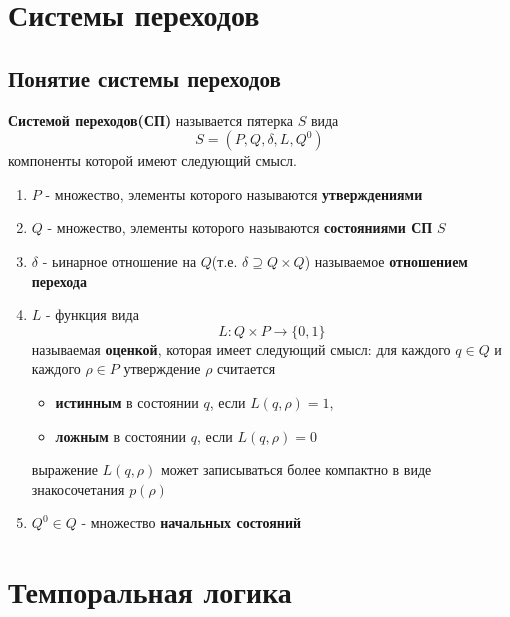 \documentclass[12pt, twoside]{report}
\begin{document}
\newpage
\section*{Системы переходов\cite{Mironov:ModelChecking}}
\label{system_SEQUENCE}

\subsection*{Понятие системы переходов}
\label{system_sequence_BASE}
\textbf{Системой переходов(СП)} называется пятерка $S$ вида
\begin{equation}\label{formula:1}
S = (P, Q, \delta, L, Q^0)
\end{equation}
компоненты которой имеют следующий смысл.
\begin{enumerate}
  \item $P$ - множество, элементы которого называются \textbf{утверждениями}
  \item $Q$ - множество, элементы которого называются \textbf{состояниями СП} $S$
  \item $\delta$ - ьинарное отношение на $Q$(т.е. $\delta \supseteq Q \times Q$) называемое 
        \textbf{отношением перехода}
  \item $L$ - функция вида
        \begin{equation}
		  L : Q \times P \to \{0, 1\}
		\end{equation}
		называемая \textbf{оценкой}, которая имеет следующий смысл: для каждого $q \in Q$ и 
		каждого $\rho \in P$ утверждение $\rho$ считается
		\begin{itemize}
		  \item \textbf{истинным} в состоянии $q$, если $L(q,\rho) = 1$, 
		  \item \textbf{ложным} в состоянии $q$, если $L(q,\rho) = 0$
		\end{itemize}
		выражение $L(q,\rho)$ может записываться более компактно в виде знакосочетания $p(\rho)$
  \item $Q^0 \in Q$ - множество \textbf{начальных состояний}   
\end{enumerate}

\section*{Темпоральная логика}\label{temporal_LOGIC}
\end{document}
